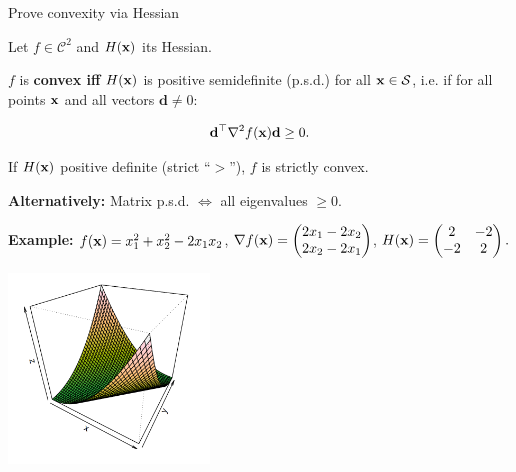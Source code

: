 \documentclass[11pt,compress,t,notes=noshow, xcolor=table]{beamer}
\begin{document}
\begin{vbframe}{Prove convexity via Hessian}

Let $f \in \mathcal{C}^2$ and $H(\mathbf{x})$ its Hessian.

\lz 

$f$ is \textbf{convex iff} $H(\mathbf{x})$ is positive semidefinite (p.s.d.) for all $\mathbf{x} \in \mathcal{S}$, i.e. if for all points $\mathbf{x}$ and all vectors $\mathbf{d} \ne 0$:

$$
\mathbf{d}^{\top} \nabla^2f(\mathbf{x})\mathbf{d} \ge 0.
$$

If $H(\mathbf{x})$ positive definite (strict \enquote{$>$}), $f$ is strictly convex.

\lz

\textbf{Alternatively:} Matrix p.s.d. $\Leftrightarrow$ all eigenvalues $\ge 0$. 


\framebreak



\begin{footnotesize}
\textbf{Example:} $f(\mathbf{x}) = x_1^2 + x_2^2 - 2x_1x_2$, $\nabla f(\mathbf{x}) = \begin{pmatrix}2x_1 - 2x_2 \\ 2x_2 - 2x_1\end{pmatrix}$, $H(\mathbf{x}) = \begin{pmatrix} 2 & -2 \\ -2 & 2 \end{pmatrix}. 
$

\begin{center}
  \includegraphics[width = 0.4\textwidth]{figure_man/convex-example.png}
\end{center}


\end{footnotesize}
\end{vbframe}
\end{document}
